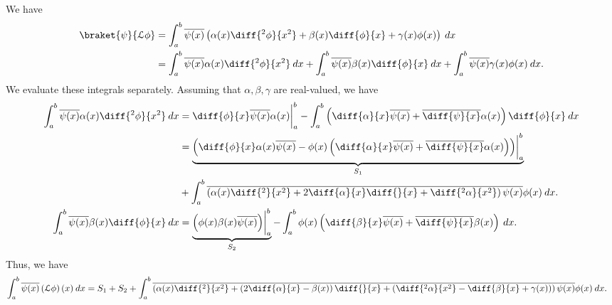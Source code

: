 \documentclass[10pt]{mypackage}
\begin{document}
\RaggedRight
\begin{solution}[40.7]
  We have
  \begin{align*}
    \braket{\psi}{\mathcal{L}\phi} &= \int_{a}^{b} \overline{\psi(x)}\left( \alpha(x)\diff{^2\phi}{x^2} + \beta(x)\diff{\phi}{x} + \gamma(x)\phi(x) \right)\:dx\\
                                   &= \int_{a}^{b} \overline{\psi(x)}\alpha(x)\diff{^2\phi}{x^2}\:dx + \int_{a}^{b} \overline{\psi(x)}\beta(x)\diff{\phi}{x}\:dx + \int_{a}^{b} \overline{\psi(x)}\gamma(x)\phi(x)\:dx.
  \end{align*}
  We evaluate these integrals separately. Assuming that $\alpha,\beta,\gamma$ are real-valued, we have
  \begin{align*}
    \int_{a}^{b} \overline{\psi(x)}\alpha(x)\diff{^2\phi}{x^2}\:dx &= \diff{\phi}{x} \overline{\psi(x)}\alpha(x)\biggr\vert_{a}^{b} - \int_{a}^{b} \left( \diff{\alpha}{x} \overline{\psi(x)} + \overline{\diff{\psi}{x}} \alpha(x) \right)\diff{\phi}{x}\:dx\\
                                                                   &= \underbrace{\left( \diff{\phi}{x}\alpha(x) \overline{\psi(x)} - \phi(x)\left( \diff{\alpha}{x} \overline{\psi(x)} + \overline{\diff{\psi}{x}} \alpha(x) \right) \right) \biggr\vert_{a}^{b}}_{S_1}\\
                                                                   &+ \int_{a}^{b} \overline{\left( \alpha(x)\diff{^2}{x^2} + 2\diff{\alpha}{x}\diff{}{x} + \diff{^2\alpha}{x^2}\right)\psi(x)}\phi(x)\:dx.\\
    \int_{a}^{b} \overline{\psi(x)}\beta(x) \diff{\phi}{x}\:dx &= \underbrace{\left( \phi(x) \beta(x) \overline{\psi(x)} \right)\biggr\vert_{a}^{b}}_{S_2} - \int_{a}^{b} \phi(x)\left( \diff{\beta}{x} \overline{\psi(x)} + \overline{\diff{\psi}{x}} \beta(x) \right)\:dx.
  \end{align*}
  Thus, we have
  \begin{align*}
    \int_{a}^{b} \overline{\psi(x)} \left( \mathcal{L}\phi \right)(x)\:dx &= S_1 + S_2 + \int_{a}^{b} \overline{\left( \alpha(x)\diff{^2}{x^2} + \left( 2\diff{\alpha}{x}-\beta(x) \right)\diff{}{x} + \left( \diff{^2\alpha}{x^2} - \diff{\beta}{x} + \gamma(x) \right) \right)\psi(x)} \phi(x)\:dx.
  \end{align*}
\end{solution}
\end{document}
